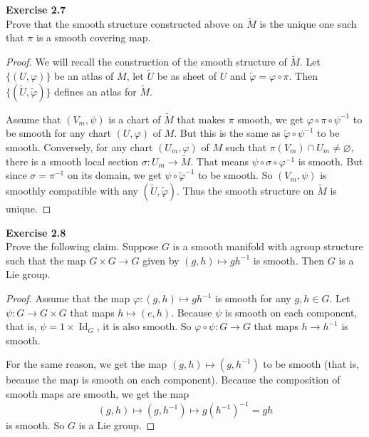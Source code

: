\documentclass[12pt, a4paper]{article}
\theoremstyle{plain}
\def\phi{\varphi}
\DeclareMathOperator{\Id}{Id}
\def\tilde{\widetilde}
\newenvironment{exercise}[2][Exercise]
    { \begin{mdframed}[backgroundcolor=gray!20] \textbf{#1 #2} \\}
    {  \end{mdframed}}
\begin{document}
\begin{exercise}{2.7}
    Prove that the smooth structure constructed above on $\tilde M$ is the unique one such that $\pi$ is a smooth covering map.
\end{exercise}
    \begin{proof}
        We will recall the construction of the smooth structure of $\tilde M$. Let $\{(U,\phi)\}$ be an atlas of $M$, let $\tilde U$ be as sheet of $U$ and $\tilde\phi=\phi\circ\pi$. Then $\{(\tilde U,\tilde\phi)\}$ defines an atlas for $\tilde M$.

        Assume that $(V_m,\psi)$ is a chart of $\tilde M$ that makes $\pi$ smooth, we get $\phi\circ\pi\circ\psi^{-1}$ to be smooth for any chart $(U,\phi)$ of $M$. But this is the same as $\tilde\phi\circ \psi^{-1}$ to be smooth. Conversely, for any chart $(U_m,\phi)$ of $M$ such that $\pi(V_m)\cap U_m\neq \varnothing$, there is a smooth local section $\sigma\colon U_m\to \tilde M$. That means $\psi\circ \sigma\circ \phi^{-1}$ is smooth. But since $\sigma=\pi^{-1}$ on its domain, we get $\psi\circ \tilde\phi^{-1}$ to be smooth. So $(V_m,\psi)$ is smoothly compatible with any $(\tilde U,\tilde \phi)$. Thus the smooth structure on $\tilde M$ is unique.
    \end{proof}


\begin{exercise}{2.8}
    Prove the following claim. Suppose $G$ is a smooth manifold with agroup structure such that the map $G\times G\to G$ given by $(g,h)\mapsto gh^{-1}$ is smooth. Then $G$ is a Lie group.
\end{exercise}
    \begin{proof}
        Assume that the map $\phi\colon(g,h)\mapsto gh^{-1}$ is smooth for any $g,h\in G$. Let $\psi\colon G\to G\times G$ that maps $h\mapsto(e,h)$. Because $\psi$ is smooth on each component, that is, $\psi=1\times \Id_G$, it is also smooth. So $\phi\circ\psi\colon G\to G$ that maps $h\to h^{-1}$ is smooth. 

        For the same reason, we get the map $(g,h)\mapsto (g,h^{-1})$ to be smooth (that is, because the map is smooth on each component). Because the composition of smooth maps are smooth, we get the map
        \[
        (g,h)\mapsto (g,h^{-1})\mapsto g(h^{-1})^{-1}=gh
        \]
        is smooth. So $G$ is a Lie group.
    \end{proof}
\end{document}
